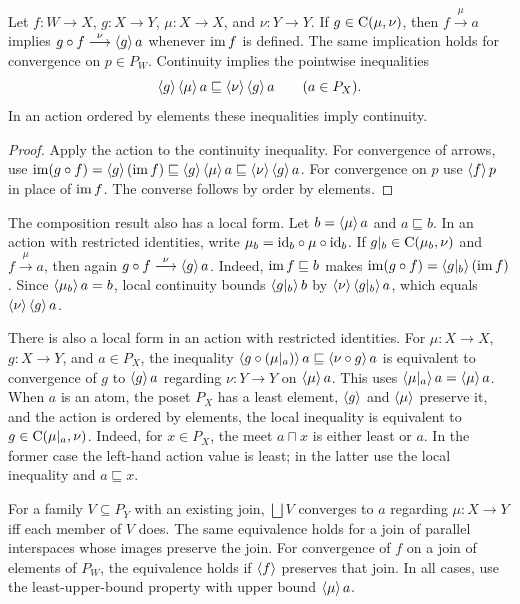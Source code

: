 \begin{prop}\label{prop-osa-cont-conv}
Let $f:W\to X$, $g:X\to Y$, $\mu:X\to X$, and $\nu:Y\to Y$.
If $g\in\mathrm{C}(\mu,\nu)$, then
$f\overset{\mu}{\longrightarrow}a$ implies
$g\circ f\overset{\nu}{\longrightarrow}\left\langle g\right\rangle a$ whenever
$\operatorname{im} f$ is defined. The same implication holds for convergence on
$p\in P_W$. Continuity implies the pointwise inequalities
\[
 \left\langle g\right\rangle\left\langle \mu\right\rangle a\sqsubseteq\left\langle \nu\right\rangle\left\langle g\right\rangle a
 \qquad(a\in P_X).
\]
In an action ordered by elements these inequalities imply continuity.
\end{prop}

\begin{proof}
Apply the action to the continuity inequality. For convergence of
arrows, use
$\operatorname{im}(g\circ f)=\left\langle g\right\rangle(\operatorname{im} f)\sqsubseteq
\left\langle g\right\rangle\left\langle \mu\right\rangle a\sqsubseteq\left\langle \nu\right\rangle\left\langle g\right\rangle a$.
For convergence on $p$ use $\left\langle f\right\rangle p$ in place of $\operatorname{im} f$.
The converse follows by order by elements.
\end{proof}

The composition result also has a local form. Let
$b=\left\langle \mu\right\rangle a$ and $a\sqsubseteq b$. In an action with restricted
identities, write $\mu_b={\operatorname{id}}_b\circ\mu\circ{\operatorname{id}}_b$. If
$g|_b\in\mathrm{C}(\mu_b,\nu)$ and
$f\overset{\mu}{\longrightarrow}a$, then again
$g\circ f\overset{\nu}{\longrightarrow}\left\langle g\right\rangle a$.
Indeed, $\operatorname{im} f\sqsubseteq b$ makes
$\operatorname{im}(g\circ f)=\left\langle g|_b\right\rangle(\operatorname{im} f)$. Since
$\left\langle \mu_b\right\rangle a=b$, local continuity bounds
$\left\langle g|_b\right\rangle b$ by $\left\langle \nu\right\rangle\left\langle g|_b\right\rangle a$,
which equals $\left\langle \nu\right\rangle\left\langle g\right\rangle a$.

There is also a local form in an action with restricted identities.
For $\mu:X\to X$, $g:X\to Y$, and $a\in P_X$, the inequality
$\left\langle g\circ(\mu|_a)\right\rangle a\sqsubseteq\left\langle \nu\circ g\right\rangle a$
is equivalent to convergence of $g$ to $\left\langle g\right\rangle a$ regarding
$\nu:Y\to Y$ on $\left\langle \mu\right\rangle a$. This uses
$\left\langle \mu|_a\right\rangle a=\left\langle \mu\right\rangle a$.
When $a$ is an atom, the poset $P_X$ has a least element,
$\left\langle g\right\rangle$ and $\left\langle \mu\right\rangle$ preserve it, and the action is
ordered by elements, the local inequality is equivalent to
$g\in\mathrm{C}(\mu|_a,\nu)$. Indeed, for $x\in P_X$, the meet
$a\sqcap x$ is either least or $a$. In the former case the
left-hand action value is least; in the latter use the local
inequality and $a\sqsubseteq x$.

For a family $V\subseteq P_Y$ with an existing join, $\bigsqcup V$
converges to $a$ regarding $\mu:X\to Y$ iff each member of $V$ does.
The same equivalence holds for a join of parallel interspaces whose
images preserve the join. For convergence of $f$ on a join of
elements of $P_W$, the equivalence holds if $\left\langle f\right\rangle$ preserves
that join. In all cases, use the least-upper-bound property with
upper bound $\left\langle \mu\right\rangle a$.

